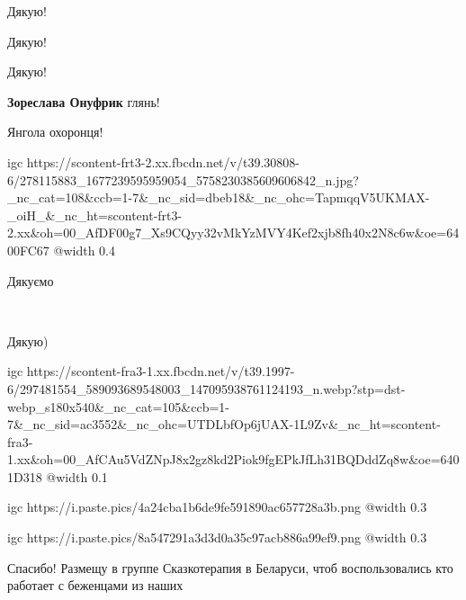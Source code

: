 
Дякую!


Дякую!

Дякую!

\textbf{Зореслава Онуфрик} глянь!

Янгола охоронця!

\ifcmt
  igc https://scontent-frt3-2.xx.fbcdn.net/v/t39.30808-6/278115883_1677239595959054_5758230385609606842_n.jpg?_nc_cat=108&ccb=1-7&_nc_sid=dbeb18&_nc_ohc=TapmqqV5UKMAX-_oiH_&_nc_ht=scontent-frt3-2.xx&oh=00_AfDF00g7_Xs9CQyy32vMkYzMVY4Kef2xjb8fh40x2N8c6w&oe=6400FC67
	@width 0.4
\fi

Дякуємо 🙏

🙏🏻💙💛

Дякую)

\ifcmt
  igc https://scontent-fra3-1.xx.fbcdn.net/v/t39.1997-6/297481554_589093689548003_147095938761124193_n.webp?stp=dst-webp_s180x540&_nc_cat=105&ccb=1-7&_nc_sid=ac3552&_nc_ohc=UTDLbfOp6jUAX-1L9Zv&_nc_ht=scontent-fra3-1.xx&oh=00_AfCAu5VdZNpJ8x2gz8kd2Piok9fgEPkJfLh31BQDddZq8w&oe=6401D318
	@width 0.1
\fi


\ifcmt
  igc https://i.paste.pics/4a24cba1b6de9fe591890ac657728a3b.png
	@width 0.3
\fi


\ifcmt
  igc https://i.paste.pics/8a547291a3d3d0a35c97acb886a99ef9.png
	@width 0.3
\fi


Спасибо! Размещу в группе Сказкотерапия в Беларуси, чтоб воспользовались кто
работает с беженцами из наших
